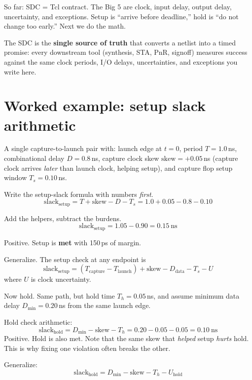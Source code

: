 \begin{pausebox}
So far: SDC = Tcl contract. The Big 5 are clock, input delay, output delay, uncertainty, and exceptions. Setup is ``arrive before deadline,'' hold is ``do not change too early.'' Next we do the math.
\end{pausebox}

\begin{keyidea}
The SDC is the \textbf{single source of truth} that converts a netlist into a timed promise: every downstream tool (synthesis, STA, PnR, signoff) measures success against the same clock periods, I/O delays, uncertainties, and exceptions you write here.
\end{keyidea}

\section{Worked example: setup slack arithmetic}

A single capture-to-launch pair with: launch edge at $t=0$, period $T=1.0$\,ns, combinational delay $D=0.8$\,ns, capture clock skew $\text{skew}=+0.05$\,ns (capture clock arrives \emph{later} than launch clock, helping setup), and capture flop setup window $T_s=0.10$\,ns.

 Write the setup-slack formula with numbers \emph{first}.
\[
\text{slack}_{\text{setup}} = T + \text{skew} - D - T_s = 1.0 + 0.05 - 0.8 - 0.10
\]

 Add the helpers, subtract the burdens.
\[
\text{slack}_{\text{setup}} = 1.05 - 0.90 = 0.15~\text{ns}
\]

 Positive. Setup is \textbf{met} with 150\,ps of margin.

 Generalize. The setup check at any endpoint is
\[
\boxed{\text{slack}_{\text{setup}} = (T_{\text{capture}} - T_{\text{launch}}) + \text{skew} - D_{\text{data}} - T_s - U}
\]
where $U$ is clock uncertainty.

Now hold. Same path, but hold time $T_h = 0.05$\,ns, and assume minimum data delay $D_{\min} = 0.20$\,ns from the same launch edge.

 Hold check arithmetic:
\[
\text{slack}_{\text{hold}} = D_{\min} - \text{skew} - T_h = 0.20 - 0.05 - 0.05 = 0.10~\text{ns}
\]
Positive. Hold is also met. Note that the same skew that \emph{helped} setup \emph{hurts} hold. This is why fixing one violation often breaks the other.

 Generalize:
\[
\boxed{\text{slack}_{\text{hold}} = D_{\min} - \text{skew} - T_h - U_{\text{hold}}}
\]

